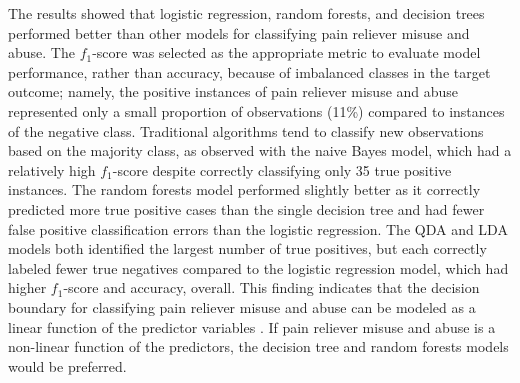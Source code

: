 \documentclass[sigconf]{acmart}
\begin{document}
The results showed that logistic regression, random forests, and decision 
trees performed better than other models for classifying pain reliever misuse 
and abuse. The $f_1$-score was selected as the appropriate metric to evaluate 
model performance, rather than accuracy, because of imbalanced classes in 
the target outcome; namely, the positive instances of pain reliever misuse 
and abuse represented only a small proportion of observations (11\%) compared
to instances of the negative class. Traditional algorithms tend to classify 
new observations based on the majority class, as observed with the naive Bayes 
model, which had a relatively high $f_1$-score despite correctly classifying 
only 35 true positive instances. The random forests model performed slightly 
better as it correctly predicted more true positive cases than the single 
decision tree and had fewer false positive classification errors than the 
logistic regression. The QDA and LDA models both identified the largest 
number of true positives, but each correctly labeled fewer true negatives
compared to the logistic regression model, which had higher $f_1$-score
and accuracy, overall. This finding indicates that the decision boundary 
for classifying pain reliever misuse and abuse can be modeled as a linear 
function of the predictor variables \cite{james13, raschka17}. If pain 
reliever misuse and abuse is a non-linear function of the predictors,
the decision tree and random forests models would be preferred.  

\end{document}

